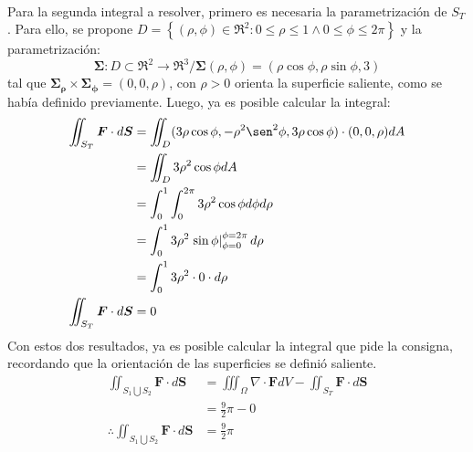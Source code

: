 \begin{solution}
\begin{align*}
    \end{align*}
    Para la segunda integral a resolver, primero es necesaria la parametrización de $S_T$. Para ello, se propone 
    $D=\left\{(\rho,\phi) \in \Re^2 : 0\leq\rho\leq1 \land 0\leq\phi\leq2\pi\right\}$ y la parametrización:
    \begin{equation*}
        \boldsymbol{\Sigma} : D \subset \Re^2 \longrightarrow \Re^3 / \boldsymbol{\Sigma}(\rho,\phi) = \left(\rho\cos{\phi},\rho\sin{\phi},3\right)
    \end{equation*}
    tal que $\boldsymbol{\Sigma_{\rho}}\times\boldsymbol{\Sigma_{\phi}} = \left(0,0,\rho\right)$, con $\rho>0$ orienta la superficie saliente, como se había definido previamente.
    Luego, ya es posible calcular la integral:
    \begin{align*}
        \iint_{S_T} \boldsymbol{F} \cdot d\boldsymbol{S} &= \iint_{D} (3\rho\cos{\phi},-\rho^2\sen^2{\phi},3\rho\cos{\phi}) \cdot (0,0,\rho)dA\\
        &= \iint_{D} 3\rho^2\cos{\phi}dA\\
        &= \int_{0}^{1} \int_{0}^{2\pi} 3\rho^2\cos{\phi} d\phi d\rho\\
        &= \int_{0}^{1} 3\rho^2\left.\sin{\phi}\right|_{\phi=0}^{\phi=2\pi} d\rho \\
        &= \int_{0}^{1} 3\rho^2\cdot 0 \cdot d\rho\\
        \iint_{S_T} \boldsymbol{F} \cdot d\boldsymbol{S} &= 0 \\
    \end{align*}
    Con estos dos resultados, ya es posible calcular la integral que pide la consigna, recordando que la orientación de las superficies se definió saliente.
    \begin{align*}
        \iint_{S_1 \bigcup S_2} \boldsymbol{F} \cdot d\boldsymbol{S} &= \iiint_{\Omega} \nabla \cdot \boldsymbol{F} dV - \iint_{S_T} \boldsymbol{F} \cdot d\boldsymbol{S}\\
        &= \frac{9}{2}\pi - 0\\
        \therefore \iint_{S_1 \bigcup S_2} \boldsymbol{F} \cdot d\boldsymbol{S} &= \frac{9}{2}\pi
    \end{align*}
\end{solution}


